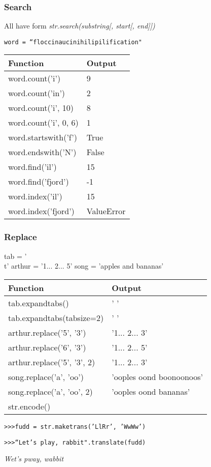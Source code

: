 \documentclass{beamer}
\begin{document}
%
%
\begin{frame}
  \frametitle{Search}
  All have form \textit{str.search(substring[, start[, end]])}
  
  \texttt{word = ``floccinaucinihilipilification"}

  \begin{table}
    \begin{tabular}{l | l}
    Function & Output \\
    \hline
    word.count('i') & 9 \\
    word.count('in') & 2 \\
    word.count('i', 10) & 8 \\
    word.count('i', 0, 6) & 1 \\
    \hline
    word.startswith('f') & True \\
    word.endswith('N') & False \\
    \hline
    word.find('il') & 15 \\
    word.find('fjord') & -1 \\
    \hline
    word.index('il') & 15 \\
    word.index('fjord') & ValueError
   \end{tabular}
  \end{table}
\end{frame}


%
%
\begin{frame}
  \frametitle{Replace}
  tab = '\\t'
  arthur = '1... 2... 5'
  song = 'apples and bananas'
  \begin{table}
    \begin{tabular}{l | l}
    Function & Output \\
    \hline
    tab.expandtabs() & '        ' \\
    tab.expandtabs(tabsize=2) & '  ' \\
    \hline
    arthur.replace('5', '3') & '1... 2... 3'\\
    arthur.replace('6', '3') & '1... 2... 5'\\
    arthur.replace('5', '3', 2) & '1... 2... 3'\\
    song.replace('a', 'oo') & 'ooples oond boonoonoos'\\
    song.replace('a', 'oo', 2) & 'ooples oond bananas'\\
   \hline
    str.encode()
   \end{tabular}
  \end{table}

  \texttt{\textgreater \textgreater \textgreater fudd = str.maketrans('LlRr', 'WwWw')}

  \texttt{\textgreater \textgreater \textgreater ``Let's play, rabbit".translate(fudd)}

  \textit{Wet's pway, wabbit}
\end{frame}
\end{document}
